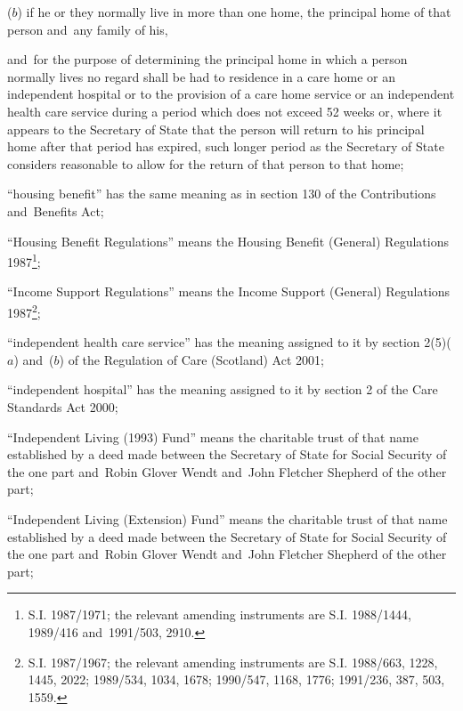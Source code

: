 \documentclass[12pt,a4paper]{article}
\begin{document}
\begin{enumerate}
\begin{enumerate}
($b$)
if he or they normally live in more than one home, the principal home of that person and~any family of his,
\end{enumerate}
and~for the purpose of determining the principal home in which a person normally lives no regard shall be had to residence in 
a care home or an independent hospital or to the provision of a care home service or an independent health care service  %
during a period which does not exceed 52 weeks or, where it appears to the 
Secretary of State  %
that the person will return to his principal home after that period has expired, such longer period as 
the Secretary of State  %
considers reasonable to allow for the return of that person to that home;

“housing benefit” has the same meaning as in section 130 of the Contributions and~Benefits Act;

“Housing Benefit Regulations” means the Housing Benefit (General) Regulations 1987\footnote{\frenchspacing S.I. 1987/1971; the relevant amending instruments are S.I. 1988/1444, 1989/416 and~1991/503, 2910.};

“Income Support Regulations” means the Income Support (General) Regulations 1987\footnote{\frenchspacing S.I. 1987/1967; the relevant amending instruments are S.I. 1988/663, 1228, 1445, 2022; 1989/534, 1034, 1678; 1990/547, 1168, 1776; 1991/236, 387, 503, 1559.};

“independent health care service” has the meaning assigned to it by section 2(5)($a$)  and~($b$)  of the Regulation of Care (Scotland) Act 2001;

“independent hospital” has the meaning assigned to it by section 2 of the Care Standards Act 2000;

“Independent Living (1993) Fund” means the charitable trust of that name established by a deed made between the Secretary of State for Social Security of the one part and~Robin Glover Wendt and~John Fletcher Shepherd of the other part;

“Independent Living (Extension) Fund” means the charitable trust of that name established by a deed made between the Secretary of State for Social Security of the one part and~Robin Glover Wendt and~John Fletcher Shepherd of the other part;


\end{enumerate}
\end{document}
